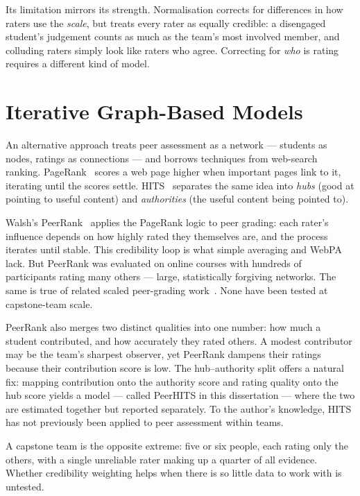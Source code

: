 Its limitation mirrors its strength. Normalisation corrects for differences in how raters use the \emph{scale}, but treats every rater as equally credible: a disengaged student's judgement counts as much as the team's most involved member, and colluding raters simply look like raters who agree. Correcting for \emph{who} is rating requires a different kind of model.

\section{Iterative Graph-Based Models}
\label{sec:peerrank}

An alternative approach treats peer assessment as a network — students as nodes, ratings as connections — and borrows techniques from web-search ranking. PageRank~\citep{page1999pagerank} scores a web page higher when important pages link to it, iterating until the scores settle. HITS~\citep{kleinberg1999hits} separates the same idea into \emph{hubs} (good at pointing to useful content) and \emph{authorities} (the useful content being pointed to).

Walsh's PeerRank~\citep{walsh2014peerrank} applies the PageRank logic to peer grading: each rater's influence depends on how highly rated they themselves are, and the process iterates until stable. This credibility loop is what simple averaging and WebPA lack. But PeerRank was evaluated on online courses with hundreds of participants rating many others — large, statistically forgiving networks. The same is true of related scaled peer-grading work~\citep{piech2013tuned, dealfaro2013crowdgrader}. None have been tested at capstone-team scale.

\label{sec:peerhits-bg}
PeerRank also merges two distinct qualities into one number: how much a student contributed, and how accurately they rated others. A modest contributor may be the team's sharpest observer, yet PeerRank dampens their ratings because their contribution score is low. The hub--authority split offers a natural fix: mapping contribution onto the authority score and rating quality onto the hub score yields a model — called PeerHITS in this dissertation — where the two are estimated together but reported separately. To the author's knowledge, HITS has not previously been applied to peer assessment within teams.

A capstone team is the opposite extreme: five or six people, each rating only the others, with a single unreliable rater making up a quarter of all evidence. Whether credibility weighting helps when there is so little data to work with is untested.


